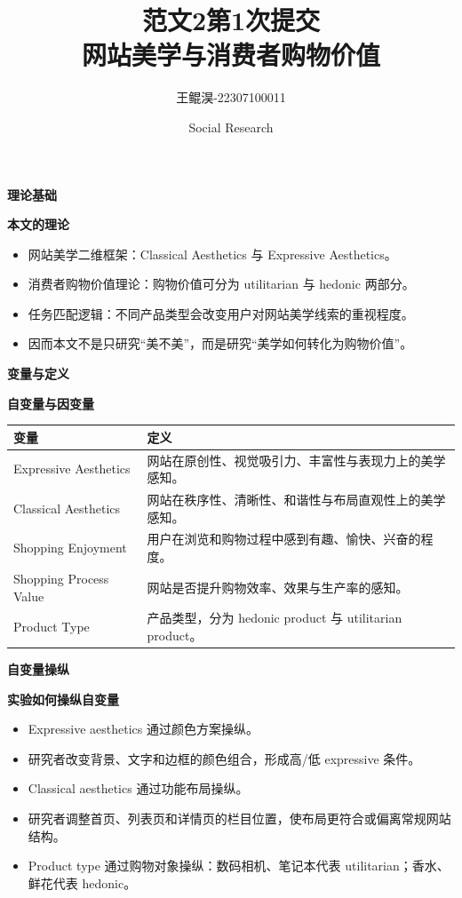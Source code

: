 \documentclass[aspectratio=169,UTF8,zihao=-4]{ctexbeamer}
\title{范文2第1次提交\\网站美学与消费者购物价值}
\author{王鲲淏-22307100011}
\date{Social Research}
\newcommand{\bigidea}[1]{
  \begin{center}
    \vspace{0.8em}
    {\LARGE \bfseries #1}
    \vspace{0.6em}
  \end{center}
}
\newcommand{\sectionpageframe}[1]{
  \begin{frame}[plain]
    \begin{center}
      \vfill
      {\Huge \bfseries #1}
      \vfill
    \end{center}
  \end{frame}
}
\begin{document}
\begin{frame}[plain]
  \titlepage
\end{frame}

\sectionpageframe{理论基础}

\begin{frame}
  \bigidea{本文的理论}
  \begin{itemize}
    \item \Large 网站美学二维框架：Classical Aesthetics 与 Expressive Aesthetics。
    \item \Large 消费者购物价值理论：购物价值可分为 utilitarian 与 hedonic 两部分。
    \item \Large 任务匹配逻辑：不同产品类型会改变用户对网站美学线索的重视程度。
    \item \Large 因而本文不是只研究“美不美”，而是研究“美学如何转化为购物价值”。
  \end{itemize}
\end{frame}

\sectionpageframe{变量与定义}

\begin{frame}
  \bigidea{自变量与因变量}
  \small
  \begin{tabular}{p{3.0cm}p{7.0cm}}
    \toprule
    变量 & 定义 \\
    \midrule
    Expressive Aesthetics & 网站在原创性、视觉吸引力、丰富性与表现力上的美学感知。 \\
    Classical Aesthetics & 网站在秩序性、清晰性、和谐性与布局直观性上的美学感知。 \\
    Shopping Enjoyment & 用户在浏览和购物过程中感到有趣、愉快、兴奋的程度。 \\
    Shopping Process Value & 网站是否提升购物效率、效果与生产率的感知。 \\
    Product Type & 产品类型，分为 hedonic product 与 utilitarian product。 \\
    \bottomrule
  \end{tabular}
\end{frame}

\sectionpageframe{自变量操纵}

\begin{frame}
  \bigidea{实验如何操纵自变量}
  \begin{itemize}
    \item \Large Expressive aesthetics 通过颜色方案操纵。
    \item \Large 研究者改变背景、文字和边框的颜色组合，形成高/低 expressive 条件。
    \item \Large Classical aesthetics 通过功能布局操纵。
    \item \Large 研究者调整首页、列表页和详情页的栏目位置，使布局更符合或偏离常规网站结构。
    \item \Large Product type 通过购物对象操纵：数码相机、笔记本代表 utilitarian；香水、鲜花代表 hedonic。
  \end{itemize}
\end{frame}
\end{document}
